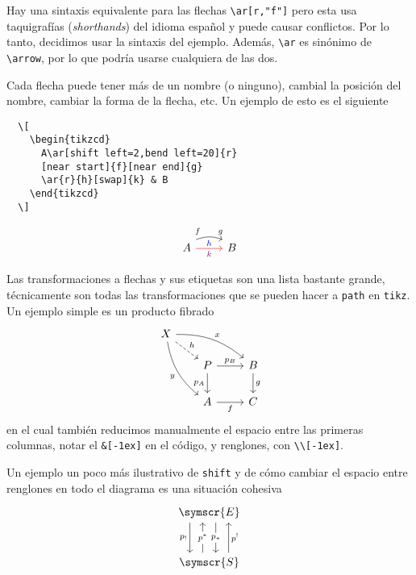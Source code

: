 Hay una sintaxis equivalente para las flechas \verb|\ar[r,"f"]| pero esta usa taquigrafías (\textit{shorthands}) del idioma español y puede causar conflictos. Por lo tanto, decidimos usar la sintaxis del ejemplo. Además, \verb|\ar| es sinónimo de \verb|\arrow|, por lo que podría usarse cualquiera de las dos.

Cada flecha puede tener más de un nombre (o ninguno), cambial la posición del nombre, cambiar la forma de la flecha, etc. Un ejemplo de esto es el siguiente

\begin{minipage}{0.4\linewidth}
\begin{verbatim}
  \[
    \begin{tikzcd}
      A\ar[shift left=2,bend left=20]{r}
      [near start]{f}[near end]{g}
      \ar{r}{h}[swap]{k} & B
    \end{tikzcd}
  \]
\end{verbatim}
\end{minipage}%
\begin{minipage}{0.5\linewidth}
\[
  \begin{tikzcd}
    A\ar[shift left=2,bend left=20]{r}[near start]{f}[near end]{g}
    \ar[red]{r}[blue]{h}[swap,violet]{k} & B
  \end{tikzcd}
\]
\end{minipage}

Las transformaciones a flechas y sus etiquetas son una lista bastante grande, técnicamente son todas las transformaciones que se pueden hacer a \texttt{path} en \texttt{tikz}. Un ejemplo simple es un producto fibrado
\[
  \begin{tikzcd}
    X\ar[bend left=20]{rrd}{x}\ar[dashed]{rd}{h}
     \ar[bend right=20]{rdd}[swap]{y}\\[-1ex]
    &[-1ex] P\ar{r}{p_B}\ar{d}[swap]{p_A} & B\ar{d}{g}\\
    & A\ar{r}[swap]{f} & C
  \end{tikzcd}
\]
en el cual también reducimos manualmente el espacio entre las primeras
columnas, notar el \verb|&[-1ex]| en el código, y renglones, con
\verb|\\[-1ex]|.

Un ejemplo un poco más ilustrativo de \texttt{shift} y de cómo cambiar el espacio entre renglones en todo el diagrama es una situación cohesiva
\[
  \begin{tikzcd}[row sep=large]
    \symscr{E}\ar[xshift=-4ex]{d}[swap]{p_!}
    \ar[xshift=1.35ex]{d}[description]{p_*}\\
    \symscr{S}\ar[xshift=4ex]{u}[swap]{p^!}
    \ar[xshift=-1.35ex]{u}[description]{p^*}
  \end{tikzcd}
\]

